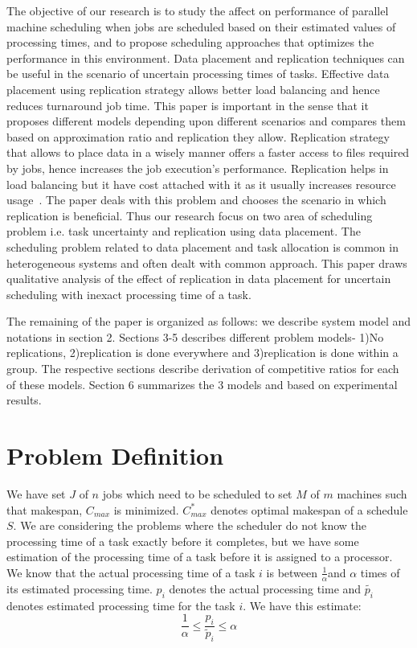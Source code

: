 \documentclass[10pt, conference, compsocconf]{IEEEtran}
\begin{document}
 The objective of our research is to study the affect on performance of parallel machine scheduling when jobs are scheduled based on their estimated values of processing times, and to propose scheduling approaches that optimizes the performance in this environment. Data  placement and replication techniques can be useful in the scenario of uncertain processing times of tasks. Effective data placement using replication strategy allows better load balancing and hence reduces turnaround job time. This paper is important in the sense that it proposes different models depending upon different scenarios and compares them based on approximation ratio and replication they allow. Replication strategy that allows to place data in a wisely manner offers a faster access to files required by jobs, hence increases the job execution's performance. Replication helps in load balancing but it have cost attached with it as it usually increases resource usage~\cite{DBLP:journals/corr/WangJW14}. The paper deals with this problem and chooses the scenario in which replication is beneficial. Thus our research focus on two area of scheduling problem i.e. task uncertainty and replication using data placement. The scheduling problem related to data placement and task allocation is common in heterogeneous systems and often dealt with common approach. This paper draws qualitative analysis of the effect of replication in data placement for uncertain scheduling with inexact processing time of a task.

 The remaining of the paper is organized as follows: we describe system model and notations in section 2. Sections 3-5 describes different problem models- 1)No replications, 2)replication is done everywhere and 3)replication is done within a group. The respective sections describe derivation of competitive ratios for each of these models. Section 6 summarizes the 3 models and based on experimental results.  

\section{Problem Definition}
We have set $J$ of $n$ jobs which need to be scheduled to set $M$ of $m$ machines such that makespan, $C_{max}$ is minimized.   $C_{max}^{*}$ denotes optimal makespan of a schedule $S$.   We are considering the problems where the scheduler do not know the processing time of a task exactly before it completes, but we have some estimation of the processing time of a task before it is  assigned to a processor. We know that the actual processing time of a task $i$ is between $\frac{1}{\alpha}$and $\alpha$ times of its estimated processing time. $p_i$ denotes the actual processing time and $\tilde {p_i}$ denotes
estimated processing time for the task $i$.  We have this estimate:\\
 \begin{equation}\label{eq1}
\frac{1}{\alpha}\leq \frac{p_{i}}{\tilde{p}_{i}}\leq \alpha
\end{equation}\\
\end{document}
